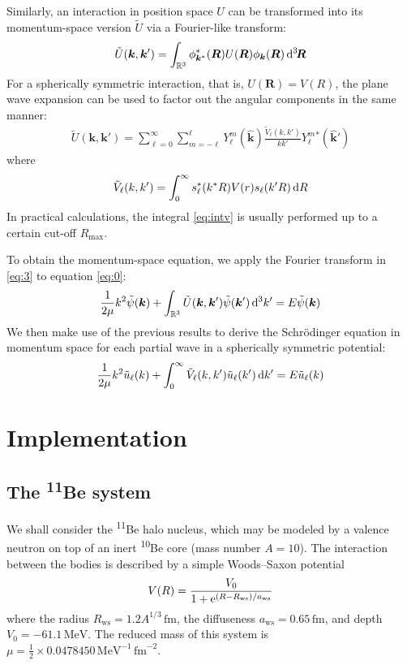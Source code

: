 \documentclass[amsmath, amssymb, aps, floatfix, nofootinbib, preprintnumbers,
  showpacs, superscriptaddress, twocolumn]{revtex4-1}
\begin{document}
Similarly, an interaction in position space $U$ can be transformed into its
momentum-space version $\tilde U$ via a Fourier-like transform:
\begin{align*}
  \tilde U(\bm k, \bm k') = \int_{\mathbb R^3}
  \phi^*_{\bm k^*}(\bm R) U(\bm R) \phi_{\bm k}(\bm R) \operatorname{d \!}\mathord{}^3\!\bm R
\end{align*}
For a spherically symmetric interaction, that is, $U(\bm R) = V(R)$, the plane
wave expansion can be used to factor out the angular components in the same
manner:
\begin{align*}
  \tilde U(\bm k, \bm k') = \sum_{\ell = 0}^\infty \sum_{m = -\ell}^\ell
  Y_\ell^m(\hat{\bm k}) \frac{\tilde V_\ell(k, k')}{k k'} Y_\ell^m{}^*(\hat{\bm k}')
\end{align*}
where
\begin{align} \label{eq:intv}
  \tilde V_\ell(k, k') = \int_0^\infty s^*_\ell(k^* R) V(r) s_\ell(k' R) \operatorname{d \!}\mathord{} R
\end{align}
In practical calculations, the integral \eqref{eq:intv} is usually performed
up to a certain cut-off $R_{\text{max}}$.

To obtain the momentum-space equation, we apply the Fourier transform in
\eqref{eq:3} to equation \eqref{eq:0}:
\begin{align*}
  \frac{1}{2 \mu} k^2 \tilde \psi(\bm k)
  + \int_{\mathbb R^3} \tilde U(\bm k, \bm k') \tilde \psi(\bm k') \operatorname{d \!}\mathord{}^3 k'
  = E \tilde \psi(\bm k)
\end{align*}
We then make use of the previous results to derive the Schr\"odinger equation
in momentum space for each partial wave in a spherically symmetric potential:
\begin{align} \label{eq:msse}
  \frac{1}{2 \mu} k^2 \tilde u_\ell(k)
  + \int_0^\infty \tilde V_\ell(k, k') \tilde u_\ell(k') \operatorname{d \!}\mathord{} k'
  = E \tilde u_\ell(k)
\end{align}

\section{Implementation}

\subsection{The \textsuperscript{11}B\lowercase{e} system}

We shall consider the \textsuperscript{11}Be halo nucleus, which may be
modeled by a valence neutron on top of an inert \textsuperscript{10}Be core
(mass number $A = 10$).  The interaction between the bodies is described by a
simple Woods--Saxon potential
\begin{align*}
  V(R) = \frac{V_0}{1 + \mathrm e^{(R - R_{\text{ws}}) / a_{\text{ws}}}}
\end{align*}
where the radius $R_{\text{ws}} = 1.2 A^{1/3}\,\mathrm{fm}$, the diffuseness
$a_{\text{ws}} = 0.65\,\mathrm{fm}$, and depth $V_0 = -61.1\,\mathrm{MeV}$.
The reduced mass of this system is
$\mu = \frac{1}{2} \times 0.0478450\,\mathrm{MeV}^{-1}\,\mathrm{fm}^{-2}$.
\end{document}

